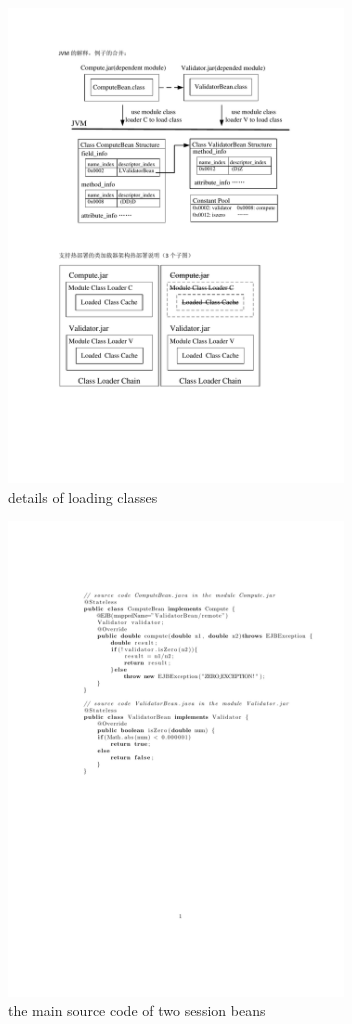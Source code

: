 \documentclass[conference]{IEEEtran}
\begin{document}
\begin{figure}[!t]
\centering
\includegraphics[width=3.5in]{ExampleEJB.pdf}
\caption{details of loading classes}
\label{fig:example}
\end{figure}

\begin{figure}[!t]
\centering
\includegraphics[width=3.5in]{ejb_source_code.pdf}
\caption{the main source code of two session beans}
\label{fig:ejb_source_code}
\end{figure}
\end{document}
